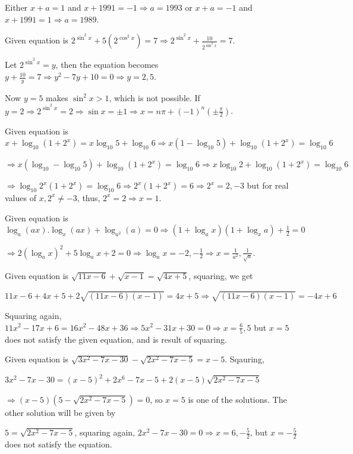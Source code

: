   Either $x + a = 1$ and $x + 1991 = -1\Rightarrow a = 1993$ or $x + a = -1$ and $x + 1991 = 1\Rightarrow a
  = 1989$.
\item Given equation is $2^{\sin^2x} + 5(2^{\cos^2x}) = 7 \Rightarrow 2^{\sin^2x} + \frac{10}{2^{\sin^2x}} = 7$.

  Let $2^{\sin^2x} = y$, then the equation becomes $y + \frac{10}{y} = 7 \Rightarrow y^2 - 7y + 10 = 0
  \Rightarrow y = 2, 5$.

  Now $y = 5$ makes $\sin^2x > 1$, which is not possible. If $y = 2\Rightarrow 2^{\sin^2x} = 2\Rightarrow
  \sin x = \pm1 \Rightarrow x = n\pi + (-1)^n\left(\pm\frac{\pi}{2}\right)$.
\item Given equation is $x + \log_{10}(1 + 2^x) = x\log_{10}5 + \log_{10}6 \Rightarrow x(1 - \log_{10}5) +
  \log_{10}(1 + 2^x) = \log_{10}6$

  $\Rightarrow x(\log_{10} - \log_{10}5) + \log_{10}(1 + 2^x) = \log_{10}6 \Rightarrow x\log_{10}2 +
  \log_{10}(1 + 2^x) = \log_{10}6$

  $\Rightarrow \log_{10}2^x(1 + 2^x) = \log_{10}6\Rightarrow 2^x(1 + 2^x) = 6\Rightarrow 2^x = 2, -3$ but
  for real values of $x, 2^x\neq -3$, thus, $2^x = 2 \Rightarrow x = 1$.
\item Given equation is $\log_a(ax).\log_x(ax) + \log_{a^2}(a) = 0\Rightarrow (1 + \log_ax)(1 + \log_xa) +
  \frac{1}{2} = 0$

  $\Rightarrow 2(\log_ax)^2 + 5\log_ax + 2 = 0 \Rightarrow \log_ax = -2, -\frac{1}{2}\Rightarrow x =
  \frac{1}{a^2}, \frac{1}{\sqrt{a}}$.
\item Given equation is $\sqrt{11x - 6} + \sqrt{x - 1} = \sqrt{4x + 5}$, squaring, we get

  $11x - 6 + 4x + 5 + 2\sqrt{(11x - 6)(x - 1)} = 4x + 5 \Rightarrow \sqrt{(11x - 6)(x - 1)} = -4x + 6$

  Squaring again, $11x^2 - 17x + 6 = 16x^2 - 48x + 36 \Rightarrow 5x^2 - 31x + 30 = 0\Rightarrow x =
  \frac{6}{5}, 5$ but $x = 5$ does not satisfy the given equation, and is result of squaring.
\item Given equation is $\sqrt{3x^2 - 7x - 30} - \sqrt{2x^2 - 7x - 5} = x - 5$. Sqauring,

  $3x^2 - 7x - 30 = (x - 5)^2 + 2x^6 - 7x - 5 + 2(x - 5)\sqrt{2x^2 - 7x - 5}$

  $\Rightarrow (x - 5)(5 - \sqrt{2x^2 - 7x - 5}) = 0$, so $x = 5$ is one of the solutions. The other
  solution will be given by

  $5 = \sqrt{2x^2 - 7x - 5}$, squaring again, $2x^2 - 7x - 30 = 0\Rightarrow x = 6, -\frac{5}{2}$, but $x =
  -\frac{5}{2}$ does not satisfy the equation.


